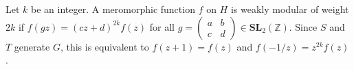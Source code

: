 Let $k$ be an integer. A meromorphic function $f$ on $H$ is weakly modular of weight $2k$ if $f(gz) = (cz+d)^{2k} f(z)$ for all $g = \begin{pmatrix}a&b\\c&d\end{pmatrix} \in \mathbf{SL}_2(\mathbb{Z})$. Since $S$ and $T$ generate $G$, this is equivalent to $f(z+1) = f(z)$ and $f(-1/z) = z^{2k}f(z)$.

